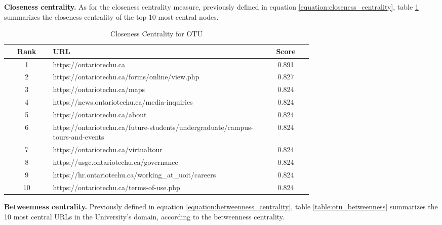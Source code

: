 \textbf{Closeness centrality.} As for the closeness centrality measure, previously defined in equation \ref{equation:closeness_centrality}, table \ref{table:otu_closeness} summarizes the closeness centrality of the top 10 most central nodes.

\begin{table}
    \centering
    \begin{tabular}{|c|p{0.7\linewidth}|c|}
        \hline
        \textbf{Rank} & \textbf{URL} & \textbf{Score} \\
        \hline
        1 & https://ontariotechu.ca & 0.891 \\ \hline
        2 & https://ontariotechu.ca/forms/online/view.php & 0.827 \\ \hline
        3 & https://ontariotechu.ca/maps & 0.824 \\ \hline
        4 & https://news.ontariotechu.ca/media-inquiries & 0.824 \\ \hline
        5 & https://ontariotechu.ca/about & 0.824 \\ \hline
        6 & https://ontariotechu.ca/future-students/undergraduate/campus-tours-and-events & 0.824 \\ \hline
        7 & https://ontariotechu.ca/virtualtour & 0.824 \\ \hline
        8 & https://usgc.ontariotechu.ca/governance & 0.824 \\ \hline
        9 & https://hr.ontariotechu.ca/working\_at\_uoit/careers & 0.824 \\ \hline
        10 & https://ontariotechu.ca/terms-of-use.php & 0.824 \\ \hline
    \end{tabular}
    \caption{Closeness Centrality for OTU}
    \label{table:otu_closeness}
\end{table}

\textbf{Betweenness centrality.} Previously defined in equation \ref{equation:betweenness_centrality}, table \ref{table:otu_betweenness} summarizes the 10 most central URLs in the University's domain, according to the betweenness centrality.

